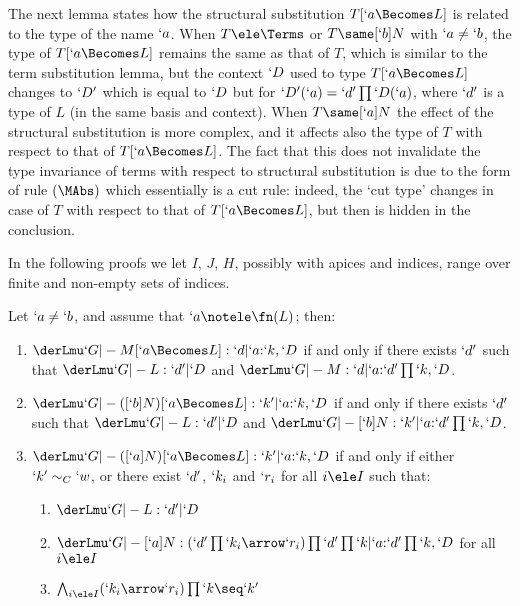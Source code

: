 \documentclass{lmcs}
\begin{document}
The next lemma states how the structural substitution $T[`a\Becomes L]$ is related to the type of the name $`a$. 
When $T\ele \Terms$ or $T\same [`b]N$ with $`a \neq `b$, the type of $T[`a\Becomes L]$ remains the same as that of $T$, which is similar to the term substitution lemma, but the context $`D $ used to type $T[`a\Becomes L]$ changes to $`D'$ which is equal to $`D $ but for $`D'(`a) = `d'\prod`D(`a)$, where $`d'$ is a type of $L$ (in the same basis and context). 
When $T\same [`a]N$ the effect of the structural substitution is more complex, and it affects also the type of $T$ with respect to that of $T[`a\Becomes L]$. 
The fact that this does not invalidate the type invariance of terms with respect to structural substitution is due to the form of rule $(\MAbs)$ which essentially is a cut rule: indeed, the `cut type' changes in case of $T$ with respect to that of $T[`a\Becomes L]$, but then is hidden in the conclusion.

In the following proofs we let $I$, $J$, $H$, possibly with apices and indices, range over finite and non-empty sets of indices.


 \begin{lem}  \label{structural substitution lemma}
Let %
$`a \neq `b$, and assume that $`a \notele \fn(L)$; then:
 \begin{enumerate}

 \item \label{structural substitution lemma i}
$\derLmu `G |- {M[`a\Becomes L]} : `d | `a{:}`k,`D $ if and only if there exists $`d'$ such that $ \derLmu `G |- L : `d' | `D $ and $\derLmu `G |- M : `d | `a{:}`d'\prod`k,`D $.

 \item \label{structural substitution lemma ii}
$ \derLmu `G |- {([`b]N)[`a\Becomes L]} : `k' | `a{:}`k,`D $ if and only if there exists $`d'$ such that $ \derLmu `G |- L : `d' | `D $ and $\derLmu `G |- [`b]N : `k' | `a{:}`d'\prod`k,`D $.

 \item \label{structural substitution lemma iii}
 $\derLmu `G |- {([`a]N)[`a\Becomes L]} : `k' | `a{:}`k,`D $ if and only if either $`k' \sim_C `w$, or
there exist $`d'$, 
 $`k_i$ and $`r_i$ for all $i\ele I$ such that:
 \begin{enumerate}
 \item $\derLmu `G |- L : `d' | `D $
 \item $\derLmu `G |- {[`a]N}: (`d'\prod `k_i\arrow `r_i)\prod `d'\prod `k | `a{:}`d'\prod `k,`D $ for all $i\ele I$
 \item $\bigwedge_{i \ele I}(`k_i\arrow `r_i)\prod `k \seq `k'$
 \end{enumerate}

 \end{enumerate}
 \end{lem}
\end{document}
